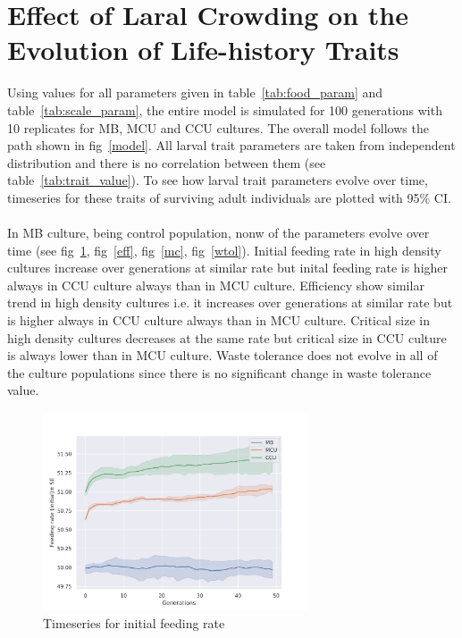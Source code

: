 \newpage
\section{Effect of Laral Crowding on the Evolution of Life-history Traits}
Using values for all parameters given in table~\ref{tab:food_param} and table~\ref{tab:scale_param}, the entire model is simulated for 100 generations with 10 replicates for MB, MCU and CCU cultures. The overall model follows the path shown in fig~\ref{model}. All larval trait parameters are taken from independent distribution and there is no correlation between them (see table~\ref{tab:trait_value}). To see how larval trait parameters evolve over time, timeseries for these traits of surviving adult individuals are plotted with 95$\%$ CI.\\ \\
In MB culture, being control population, nonw of the parameters evolve over time (see fig~\ref{fr}, fig~\ref{eff}, fig~\ref{mc}, fig~\ref{wtol}). Initial feeding rate in high density cultures increase over generations at similar rate but inital feeding rate is higher always in CCU culture always than in MCU culture. Efficiency show similar trend in high density cultures i.e. it increases over generations at similar rate but is higher always in CCU culture always than in MCU culture. Critical size in high density cultures decreases at the same rate but critical size in CCU culture is always lower than in MCU culture. Waste tolerance does not evolve in all of the culture populations since there is no significant change in waste tolerance value.
\begin{figure}[h]
  \centering
  \includegraphics[trim = 0 0 50 50, clip, width=0.7\textwidth]{C4/Figs/fr}
  \caption{Timeseries for initial feeding rate}
  \label{fr}
\end{figure}
